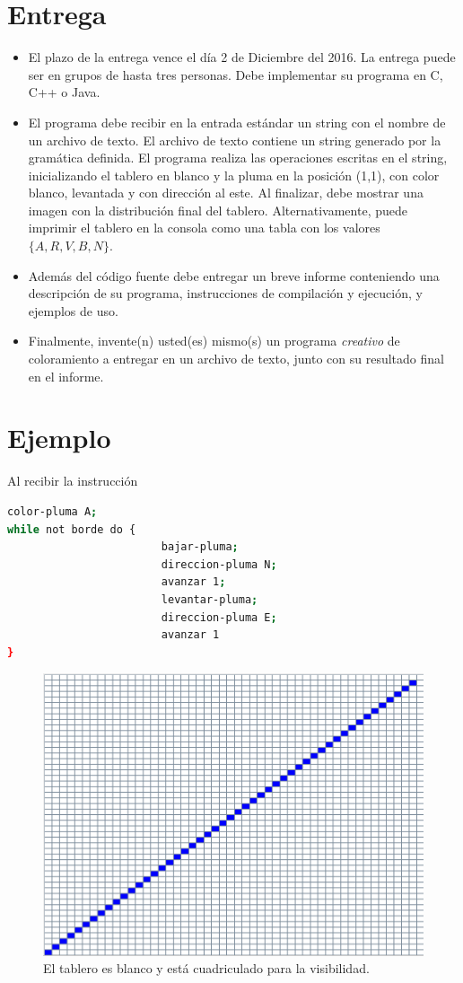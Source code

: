 \documentclass[dcc]{fcfmcourse}
\begin{document}
\section*{Entrega}
\begin{itemize}
\item El plazo de la entrega vence el día 2 de Diciembre del 2016. La entrega puede ser en grupos de hasta tres personas. Debe implementar su programa en C, C++ o Java.
\item El programa debe recibir en la entrada estándar un string con el nombre de un archivo de texto. El archivo de texto contiene un string generado por la gramática definida. El programa realiza las operaciones escritas en el string, inicializando el tablero en blanco y la pluma en la posición (1,1), con color blanco, levantada y con dirección al este. Al finalizar, debe mostrar una imagen con la distribución final del tablero. Alternativamente, puede imprimir el tablero en la consola como una tabla con los valores $\{A,R,V,B,N\}$.
\item Además del código fuente debe entregar un breve informe conteniendo una descripción de su programa, instrucciones de compilación y ejecución, y ejemplos de uso.
\item Finalmente, invente(n) usted(es) mismo(s) un programa \textit{creativo} de coloramiento a entregar en un archivo de texto, junto con su resultado final en el informe.
\end{itemize}
\newpage
\section*{Ejemplo}
Al recibir la instrucción
\begin{lstlisting}[language=bash]
color-pluma A;
while not borde do {
                        bajar-pluma;
                        direccion-pluma N;
                        avanzar 1;
                        levantar-pluma;
                        direccion-pluma E;
                        avanzar 1 
}
\end{lstlisting}
\begin{figure}[h]
\begin{center}
\includegraphics[scale=0.24]{ejemplo.png}
\caption{El tablero es blanco y está cuadriculado para la visibilidad.}
\end{center}
\end{figure}
\end{document}
